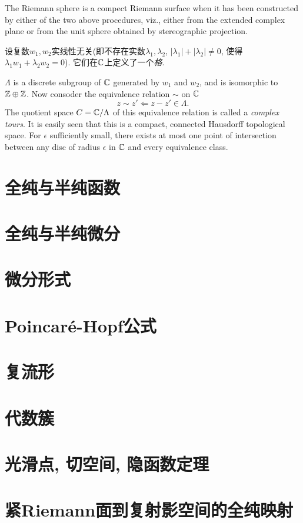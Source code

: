 \begin{example}[The set of extended complex numbers $\Sigma=\C\cup\{\infty\}$ (one point compactification of complex numbers)]
    The Riemann sphere is a compect Riemann surface when it has been constructed by either of the two above procedures, viz., either from the extended complex plane or from the unit sphere obtained by stereographic projection. 
\end{example}
\begin{example}
    设复数$w_1,w_2$实线性无关(即不存在实数$\lambda_1,\lambda_2$, $|\lambda_1|+|\lambda_2|\neq0$, 使得$\lambda_1w_1+\lambda_2w_2=0$). 它们在$\mathbb{C}$上定义了一个\textit{格}. 

    $\Lambda$ is a discrete subgroup of $\mathbb{C}$ generated by $w_1$ and $w_2$, and is isomorphic to $\mathbb{Z}\oplus\mathbb{Z}$. Now consoder the equivalence relation $\sim$ on $\mathbb{C}$ 
    \[z\sim z'\Leftarrow z-z'\in\Lambda. \]
    The quotient space $C=\mathbb{C}/\Lambda$ of this equivalence relation is called a \textit{complex tours}. It is easily seen that this is a compact, connected Hausdorff topological space. For $\epsilon$ sufficiently small, there exists at most one point of intersection between any disc of radius $\epsilon$ in $\mathbb{C}$ and every equivalence class. 
\end{example}

\section{全纯与半纯函数}\label{s1-3}

\section{全纯与半纯微分}\label{s1-4}

\section{微分形式}\label{s1-5}

\section{Poincar\texorpdfstring{\'e}{e}-Hopf公式}\label{s1-6}

\section{复流形}\label{s1-7}

\section{代数簇}\label{s1-8}

\section{光滑点, 切空间, 隐函数定理}\label{s1-9}

\section{紧Riemann面到复射影空间的全纯映射}\label{s1-10}
